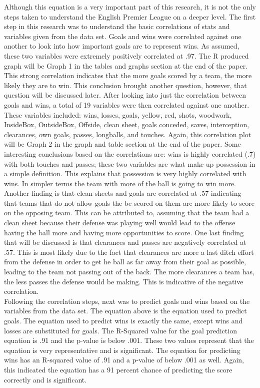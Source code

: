 \documentclass[12pt,english]{article}
\begin{document}
\indent Although this equation is a very important part of this research, it is not the only steps taken to understand the English Premier League on a deeper level. The first step in this research was to understand the basic correlations of stats and variables given from the data set. Goals and wins were correlated against one another to look into how important goals are to represent wins. As assumed, these two variables were extremely positively correlated at .97. The R produced graph will be Graph 1 in the tables and graphs section at the end of the paper. This strong correlation indicates that the more goals scored by a team, the more likely they are to win. This conclusion brought another question, however, that question will be discussed later. After looking into just the correlation between goals and wins, a total of 19 variables were then correlated against one another. These variables included: wins, losses, goals, yellow, red, shots, woodwork, InsideBox, OutsideBox, Offside, clean sheet, goals conceded, saves, interception, clearances,	own goals, passes, longballs, and touches. Again, this correlation plot will be Graph 2 in the graph and table section at the end of the paper. Some interesting conclusions based on the correlations are: wins is highly correlated (.7) with both touches and passes; these two variables are what make up possession in a simple definition. This explains that possession is very highly correlated with wins. In simpler terms the team with more of the ball is going to win more. Another finding is that clean sheets and goals are correlated at .57 indicating that teams that do not allow goals the be scored on them are more likely to score on the opposing team. This can be attributed to, assuming that the team had a clean sheet because their defense was playing well would lead to the offense having the ball more and having more opportunities to score. One last finding that will be discussed is that clearances and passes are negatively correlated at .57. This is most likely due to the fact that clearances are more a last ditch effort from the defense in order to get he ball as far away from their goal as possible, leading to the team not passing out of the back. The more clearances a team has, the less passes the defense would be making. This is indicative of the negative correlation. \\
\indent Following the correlation steps, next was to predict goals and wins based on the variables from the data set. The equation above is the equation used to predict goals. The equation used to predict wins is exactly the same, except wins and losses are substituted for goals. The R-Squared value for the goal prediction equation is .91 and the p-value is below .001. These two values represent that the equation is very representative and is significant. The equation for predicting wins has an R-squared value of .91 and a p-value of below .001 as well. Again, this indicated the equation has a 91 percent chance of predicting the score correctly and is significant. \\
\end{document}
